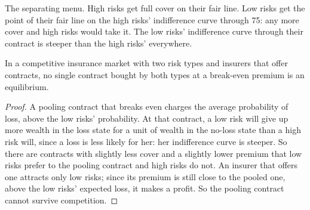 \begin{omfigure}

{\small The separating menu. High risks get full cover on their fair line. Low risks get the point of their fair line on
the high risks' indifference curve through 75: any more cover and high risks would take it. The low risks' indifference
curve through their contract is steeper than the high risks' everywhere.}
\end{omfigure}

\begin{proposition}\label{prop:b2:signalling-and-screening:no-pooling}
In a competitive insurance market with two risk types and insurers that offer contracts, no single contract bought by
both types at a break-even premium is an equilibrium.
\end{proposition}

\begin{proof}
A pooling contract that breaks even charges the average probability of loss, above the low risks' probability. At that
contract, a low risk will give up more wealth in the loss state for a unit of wealth in the no-loss state than a high risk
will, since a loss is less likely for her: her indifference curve is steeper. So there are contracts with slightly less
cover and a slightly lower premium that low risks prefer to the pooling contract and high risks do not. An insurer that
offers one attracts only low risks; since its premium is still close to the pooled one, above the low risks' expected
loss, it makes a profit. So the pooling contract cannot survive competition.
\end{proof}

